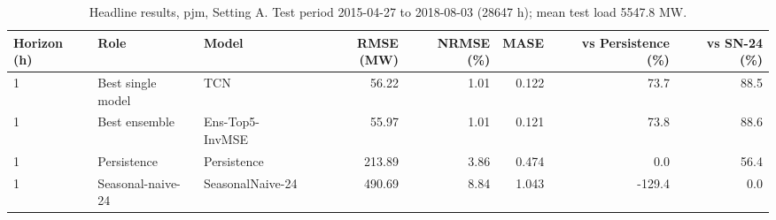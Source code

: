 \begin{table}[ht]
\centering
\small
\caption{Headline results, pjm, Setting A. Test period 2015-04-27 to 2018-08-03 (28647 h); mean test load 5547.8 MW.}
\label{tab:pjm_A_summary}
\begin{tabular}{lllrrrrr}
\toprule
Horizon (h) & Role & Model & RMSE (MW) & NRMSE (\%) & MASE & vs Persistence (\%) & vs SN-24 (\%) \\
\midrule
1 & Best single model & TCN & 56.22 & 1.01 & 0.122 & 73.7 & 88.5 \\
1 & Best ensemble & Ens-Top5-InvMSE & 55.97 & 1.01 & 0.121 & 73.8 & 88.6 \\
1 & Persistence & Persistence & 213.89 & 3.86 & 0.474 & 0.0 & 56.4 \\
1 & Seasonal-naive-24 & SeasonalNaive-24 & 490.69 & 8.84 & 1.043 & -129.4 & 0.0 \\
\bottomrule
\end{tabular}
\end{table}